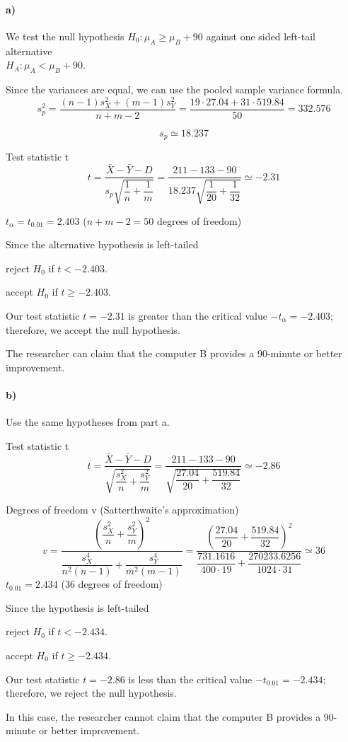 \documentclass[12pt]{article}
\begin{document}
\paragraph{a)}
We test the null hypothesis $H_0: \mu_A \geq \mu_B + 90$ against one sided left-tail alternative\\$H_A: \mu_A < \mu_B + 90$.

Since the variances are equal, we can use the pooled sample variance formula.
\[
    s_p^2 = \dfrac{(n-1)s_X^2 + (m-1)s_Y^2}{n+m-2} = \dfrac{19\cdot27.04 + 31\cdot519.84}{50} = 332.576
\]

\[
    s_p \simeq 18.237
\]

Test statistic t
\[
    t = \frac{\bar{X} - \bar{Y} - D}{s_p\sqrt{\dfrac{1}{n}+\dfrac{1}{m}}} = \frac{211 - 133 - 90}{18.237\sqrt{\dfrac{1}{20}+\dfrac{1}{32}}} \simeq -2.31
\]

$t_\alpha = t_{0.01} = 2.403$ ($n + m - 2 = 50$ degrees of freedom)

Since the alternative hypothesis is left-tailed
\begin{center}
    reject $H_0$ if $t < -2.403$.

    accept $H_0$ if $t \geq -2.403$.
\end{center}

Our test statistic $t = -2.31$ is greater than the critical value $-t_\alpha = -2.403$; therefore, we accept the null hypothesis.

The researcher can claim that the computer B provides a 90-minute or better improvement.
\paragraph{b)} Use the same hypotheses from part a.

Test statistic t
\[
    t = \frac{\bar{X} - \bar{Y} - D}{\sqrt{\dfrac{s_X^2}{n}+\dfrac{s_Y^2}{m}}} = \frac{211 - 133 - 90}{\sqrt{\dfrac{27.04}{20}+\dfrac{519.84}{32}}} \simeq -2.86
\]

Degrees of freedom v (Satterthwaite's approximation)
\[
    v = \dfrac{(\dfrac{s^2_X}{n}+\dfrac{s^2_Y}{m})^2}{\dfrac{s^4_X}{n^2(n-1)}+\dfrac{s^4_Y}{m^2(m-1)}} = \dfrac{(\dfrac{27.04}{20}+\dfrac{519.84}{32})^2}{\dfrac{731.1616}{400\cdot19}+\dfrac{270233.6256}{1024\cdot31}} \simeq 36
\]
$t_{0.01} = 2.434$ (36 degrees of freedom)

Since the hypothesis is left-tailed
\begin{center}
    reject $H_0$ if $t < -2.434$.

    accept $H_0$ if $t \geq -2.434$.
\end{center}

Our test statistic $t = -2.86$ is less than the critical value $-t_{0.01} = -2.434$; therefore, we reject the null hypothesis.

In this case, the researcher cannot claim that the computer B provides a 90-minute or better improvement.
\end{document}
